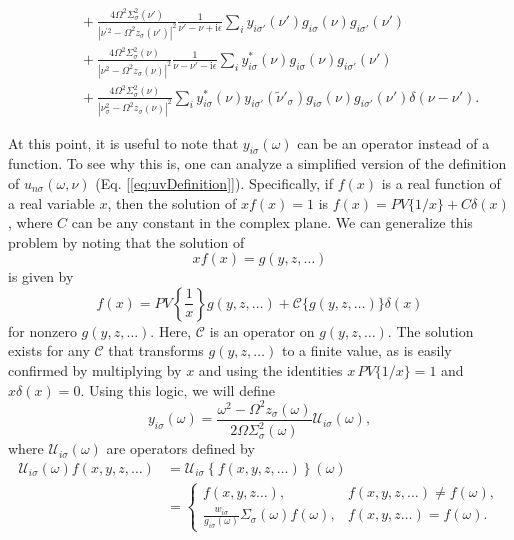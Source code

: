 \begin{equation}
\begin{split}
&\qquad + \frac{4\Omega^2\Sigma_\sigma^2(\nu')}{|\nu^{\prime2} - \Omega^2z_\sigma(\nu')|^2}\frac{1}{\nu' - \nu  + \mathrm{i}\epsilon}\sum_{i}y_{i\sigma'}(\nu')g_{i\sigma}(\nu)g_{i\sigma'}(\nu')\\
&\qquad + \frac{4\Omega^2\Sigma_\sigma^2(\nu )}{|\nu ^2 - \Omega^2z_\sigma(\nu )|^2}\frac{1}{\nu  - \nu' - \mathrm{i}\epsilon}\sum_{i}y_{i\sigma}^*(\nu )g_{i\sigma}(\nu)g_{i\sigma'}(\nu')\\
&\qquad + \frac{4\Omega^2\Sigma_\sigma^2(\nu )}{|\nu_\sigma^2 - \Omega^2z_\sigma(\nu )|^2}\sum_{i}y^*_{i\sigma}(\nu )y_{i\sigma'}(\tilde{\nu}'_\sigma)g_{i\sigma}(\nu)g_{i\sigma'}(\nu')\delta(\nu  - \nu').
\end{split}
\end{equation}

At this point, it is useful to note that $y_{i\sigma}(\omega)$ can be an operator instead of a function. To see why this is, one can analyze a simplified version of the definition of $u_{n\sigma}(\omega,\nu)$ (Eq. [\ref{eq:uvDefinition}]). Specifically, if $f(x)$ is a real function of a real variable $x$, then the solution of $xf(x) = 1$ is $f(x) = PV\{1/x\} + C\delta(x)$, where $C$ can be any constant in the complex plane. We can generalize this problem by noting that the solution of
\begin{equation}
xf(x) = g(y,z,\ldots)
\end{equation}
is given by
\begin{equation}
f(x) = PV\left\{\frac{1}{x}\right\}g(y,z,\ldots) + \mathcal{C}\{g(y,z,\ldots)\}\delta(x)
\end{equation}
for nonzero $g(y,z,\ldots)$. Here, $\mathcal{C}$ is an operator on $g(y,z,\ldots)$. The solution exists for any $\mathcal{C}$ that transforms $g(y,z,\ldots)$ to a finite value, as is easily confirmed by multiplying by $x$ and using the identities $x\,PV\{1/x\} = 1$ and $x\delta(x) = 0$. Using this logic, we will define
\begin{equation}
y_{i\sigma}(\omega) = \frac{\omega^2 - \Omega^2z_\sigma(\omega)}{2\Omega\Sigma_\sigma^2(\omega)}\mathcal{U}_{i\sigma}(\omega),
\end{equation}
where $\mathcal{U}_{i\sigma}(\omega)$ are operators defined by
\begin{equation}
\begin{split}
\mathcal{U}_{i\sigma}(\omega)f(x,y,z,\ldots) &= \mathcal{U}_{i\sigma}\left\{f(x,y,z,\ldots)\right\}(\omega)\\
&= 
\begin{cases}
f(x,y,z\ldots), & f(x,y,z,\ldots) \neq f(\omega),\\
\frac{w_{i\sigma}}{g_{i\sigma}(\omega)}\Sigma_\sigma(\omega)f(\omega), & f(x,y,z\ldots) = f(\omega). 
\end{cases}
\end{split}
\end{equation}
